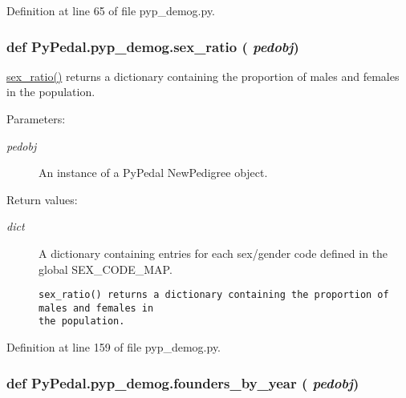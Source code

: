 Definition at line 65 of file pyp\_\-demog.py.\hypertarget{namespacePyPedal_1_1pyp__demog_f4d5903dfa9782134c42fde487037ddc}{
\subsubsection[sex\_\-ratio]{\setlength{\rightskip}{0pt plus 5cm}def Py\-Pedal.pyp\_\-demog.sex\_\-ratio ( {\em pedobj})}}
\label{namespacePyPedal_1_1pyp__demog_f4d5903dfa9782134c42fde487037ddc}


\hyperlink{namespacePyPedal_1_1pyp__demog_f4d5903dfa9782134c42fde487037ddc}{sex\_\-ratio()} returns a dictionary containing the proportion of males and females in the population. 

\begin{Desc}
\item[Parameters:]
\begin{description}
\item[{\em pedobj}]An instance of a Py\-Pedal New\-Pedigree object. \end{description}
\end{Desc}
\begin{Desc}
\item[Return values:]
\begin{description}
\item[{\em dict}]A dictionary containing entries for each sex/gender code defined in the global SEX\_\-CODE\_\-MAP.

\footnotesize\begin{verbatim}sex_ratio() returns a dictionary containing the proportion of males and females in
the population.
\end{verbatim}
\normalsize
 \end{description}
\end{Desc}


Definition at line 159 of file pyp\_\-demog.py.\hypertarget{namespacePyPedal_1_1pyp__demog_b24de2bd6acca4c7b1f9a3a0fb7aaf21}{
\subsubsection[founders\_\-by\_\-year]{\setlength{\rightskip}{0pt plus 5cm}def Py\-Pedal.pyp\_\-demog.founders\_\-by\_\-year ( {\em pedobj})}}
\label{namespacePyPedal_1_1pyp__demog_b24de2bd6acca4c7b1f9a3a0fb7aaf21}


